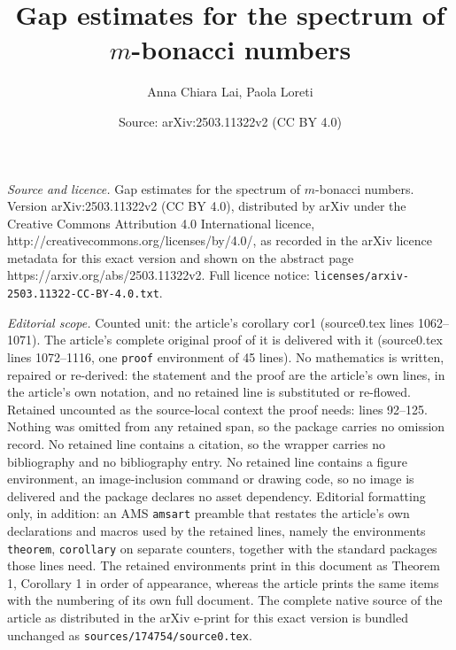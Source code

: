 \documentclass[10pt,a4paper]{amsart}
\title{Gap estimates for the spectrum of $m$-bonacci numbers}
\author{Anna Chiara Lai, Paola Loreti}
\date{Source: arXiv:2503.11322v2 (CC BY 4.0)}
\begin{document}
\maketitle

\noindent\emph{Source and licence.} Gap estimates for the spectrum of $m$-bonacci numbers. Version arXiv:2503.11322v2 (CC BY 4.0), distributed by arXiv under the Creative Commons Attribution 4.0 International licence, http://creativecommons.org/licenses/by/4.0/, as recorded in the arXiv licence metadata for this exact version and shown on the abstract page https://arxiv.org/abs/2503.11322v2. Full licence notice: \texttt{licenses/arxiv-2503.11322-CC-BY-4.0.txt}.\par\smallskip

\noindent\textit{Editorial scope.} Counted unit: the article's corollary cor1 (source0.tex lines 1062--1071). The article's complete original proof of it is delivered with it (source0.tex lines 1072--1116, one \texttt{proof} environment of 45 lines). No mathematics is written, repaired or re-derived: the statement and the proof are the article's own lines, in the article's own notation, and no retained line is substituted or re-flowed.  Retained uncounted as the source-local context the proof needs: lines 92--125.  Nothing was omitted from any retained span, so the package carries no omission record.  No retained line contains a citation, so the wrapper carries no bibliography and no bibliography entry.  No retained line contains a figure environment, an image-inclusion command or drawing code, so no image is delivered and the package declares no asset dependency.  Editorial formatting only, in addition: an AMS \texttt{amsart} preamble that restates the article's own declarations and macros used by the retained lines, namely the environments \texttt{theorem}, \texttt{corollary} on separate counters, together with the standard packages those lines need.  The retained environments print in this document as Theorem 1, Corollary 1 in order of appearance, whereas the article prints the same items with the numbering of its own full document.  The complete native source of the article as distributed in the arXiv e-print for this exact version is bundled unchanged as \texttt{sources/174754/source0.tex}.
\end{document}
